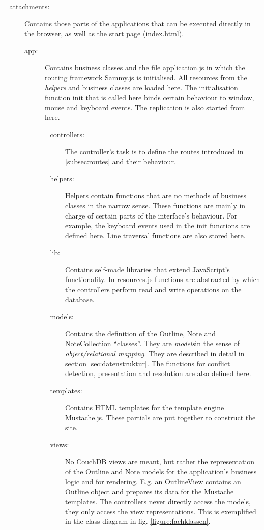 \begin{description}
  \item[\_attachments:] Contains those parts of the applications that can be executed directly in the browser, as well as the start page ({\selectfont index.html}).
    \begin{description}
      \item[app:] Contains business classes and the file {\selectfont application.js} in which the routing framework Sammy.js is initialised. All resources from the \textit{helpers} and business classes are loaded here. The initialisation function {\selectfont init} that is called here binds certain behaviour to window, mouse and keyboard events. The replication is also started from here.
        \begin{description}
          \item[\_controllers:] The controller's task is to define the routes introduced in \ref{subsec:routes} and their behaviour.
          \item[\_helpers:] Helpers contain functions that are no methods of business classes in the narrow sense. These functions are mainly in charge of certain parts of the interface's behaviour. For example, the keyboard events used in the {\selectfont init} functions are defined here. Line traversal functions are also stored here.
          \item[\_lib:] Contains self-made libraries that extend JavaScript's functionality. In {\selectfont resources.js} functions are abstracted by which the controllers perform read and write operations on the database.
          \item[\_models:] Contains the definition of the {\selectfont Outline}, {\selectfont Note} and {\selectfont NoteCollection} \enquote{classes}. They are \textit{models}in the sense of \textit{object/relational mapping}. They are described in detail in section \ref{sec:datenstruktur}. The functions for conflict detection, presentation and resolution are also defined here.
          \item[\_templates:] Contains HTML templates for the template engine Mustache.js. These partials are put together to construct the site.
          \item[\_views:] No CouchDB views are meant, but rather the representation of the {\selectfont Outline} and {\selectfont Note} models for the application's business logic and for rendering. E.g. an {\selectfont OutlineView} contains an {\selectfont Outline} object and prepares its data for the Mustache templates. The controllers never directly access the models, they only access the view representations. This is exemplified in the class diagram in fig. \ref{figure:fachklassen}.
        \end{description}
        

\end{description}
\end{description}
